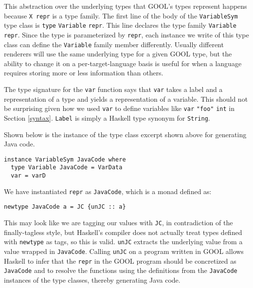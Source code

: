 \documentclass[sigplan,review,anonymous]{acmart}
\begin{document}
This abstraction over the underlying types that GOOL's types represent happens 
because \verb|X repr| is a type family. The first line of the body of the 
\verb|VariableSym| type class is \verb|type| \verb|Variable| \verb|repr|. This 
line declares the type family \verb|Variable| \verb|repr|. Since the type is 
parameterized by \verb|repr|, each instance we write of this type class can 
define the \verb|Variable| family member differently. Usually different 
renderers will use the same underlying type for a given GOOL type, but the 
ability to change it on a per-target-language basis is useful for when a 
language requires storing more or less information than others.

The type signature for the \verb|var| function says that \verb|var| takes a 
label and a representation of a type and yields a representation of a variable. 
This should not be surprising given how we used \verb|var| to define variables 
like \verb|var| \verb|"foo"| \verb|int| in Section \ref{syntax}. \verb|Label| 
is simply a Haskell type synonym for \verb|String|. 

Shown below is the instance of the type class excerpt shown above for 
generating Java code. 
\begin{lstlisting}
instance VariableSym JavaCode where
  type Variable JavaCode = VarData
  var = varD
\end{lstlisting}
We have instantiated \verb|repr| as \verb|JavaCode|, which is a monad defined 
as:
\begin{lstlisting}
newtype JavaCode a = JC {unJC :: a}
\end{lstlisting}
This may look like we are tagging our values with \verb|JC|, in contradiction 
of the finally-tagless style, but Haskell's compiler does not actually treat 
types defined with \verb|newtype| as tags, so this is valid. \verb|unJC| 
extracts the underlying value from a value wrapped in \verb|JavaCode|. Calling 
\verb|unJC| on a program written in GOOL allows Haskell to infer that the 
\verb|repr| in the GOOL program should be concretized as \verb|JavaCode| and to 
resolve the functions using the definitions from the \verb|JavaCode| instances 
of the type classes, thereby generating Java code.
\end{document}
